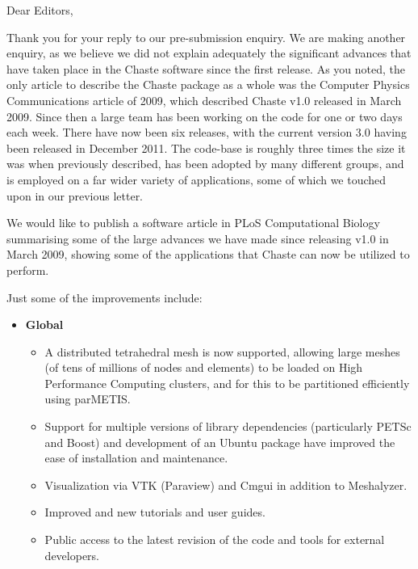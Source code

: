 \documentclass{oxcsletter}
\begin{document}
\begin{letter}{}

\subject{Pre-submission enquiry to PLoS Computational Biology}  

\opening{Dear Editors,}

Thank you for your reply to our pre-submission enquiry.
We are making another enquiry, as we believe we did not explain adequately the significant advances that have taken place in the Chaste software since the first release.
As you noted, the only article to describe the Chaste package as a whole was the Computer Physics Communications article of 2009, which described Chaste v1.0 released in March 2009.
Since then a large team has been working on the code for one or two days each week.
There have now been six releases, with the current version 3.0 having been released in December 2011.
The code-base is roughly three times the size it was when previously described, has been adopted by many different groups, 
and is employed on a far wider variety of applications, some of which we touched upon in our previous letter.

We would like to publish a software article in PLoS Computational Biology summarising some of the large advances we have made since releasing v1.0 in March 2009, 
showing some of the applications that Chaste can now be utilized to perform.

Just some of the improvements include:
\begin{itemize}
 \item \textbf{Global}
 \begin{itemize}
  \item A distributed tetrahedral mesh is now supported, allowing large meshes (of tens of millions of nodes and elements) to be loaded on High Performance Computing clusters, and for this to be partitioned efficiently using parMETIS.
  \item Support for multiple versions of library dependencies (particularly PETSc and Boost) and development of an Ubuntu package have improved the ease of installation and maintenance.
  \item Visualization via VTK (Paraview) and Cmgui in addition to Meshalyzer.
  \item Improved and new tutorials and user guides.
  \item Public access to the latest revision of the code and tools for external developers.
 \end{itemize}


\end{itemize}
\end{letter}
\end{document}

